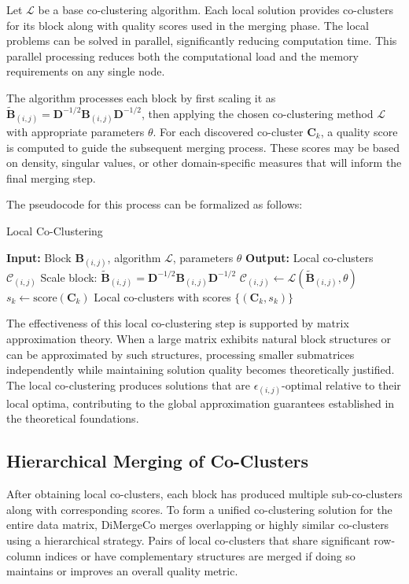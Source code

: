 \documentclass[journal]{IEEEtran}
\begin{document}
Let $\mathcal{L}$ be a base co-clustering algorithm. Each local solution provides co-clusters for its block along with quality scores used in the merging phase. The local problems can be solved in parallel, significantly reducing computation time. This parallel processing reduces both the computational load and the memory requirements on any single node.

The algorithm processes each block by first scaling it as $\tilde{\mathbf{B}}_{(i,j)} = \mathbf{D}^{-1/2}\mathbf{B}_{(i,j)}\mathbf{D}^{-1/2}$, then applying the chosen co-clustering method $\mathcal{L}$ with appropriate parameters $\theta$. For each discovered co-cluster $\mathbf{C}_k$, a quality score is computed to guide the subsequent merging process. These scores may be based on density, singular values, or other domain-specific measures that will inform the final merging step.

The pseudocode for this process can be formalized as follows:

\begin{algorithm}[t]
    \caption{Local Co-Clustering}
    \label{alg:local_co_clustering}
    \begin{algorithmic}
        \STATE \textbf{Input:} Block $\mathbf{B}_{(i,j)}$, algorithm $\mathcal{L}$, parameters $\theta$
        \STATE \textbf{Output:} Local co-clusters $\mathcal{C}_{(i,j)}$
        \STATE Scale block: $\tilde{\mathbf{B}}_{(i,j)} = \mathbf{D}^{-1/2}\mathbf{B}_{(i,j)}\mathbf{D}^{-1/2}$
        \STATE $\mathcal{C}_{(i,j)} \leftarrow \mathcal{L}(\tilde{\mathbf{B}}_{(i,j)}, \theta)$
        \STATE $s_k \leftarrow \text{score}(\mathbf{C}_k)$
        \ENDFOR
        \RETURN Local co-clusters with scores $\{(\mathbf{C}_k, s_k)\}$
    \end{algorithmic}
\end{algorithm}


The effectiveness of this local co-clustering step is supported by matrix approximation theory. When a large matrix exhibits natural block structures or can be approximated by such structures, processing smaller submatrices independently while maintaining solution quality becomes theoretically justified. The local co-clustering produces solutions that are $\epsilon_{(i,j)}$-optimal relative to their local optima, contributing to the global approximation guarantees established in the theoretical foundations.

\subsection{Hierarchical Merging of Co-Clusters}
\label{subsec:hierarchical_merging}
After obtaining local co-clusters, each block has produced multiple sub-co-clusters along with corresponding scores. To form a unified co-clustering solution for the entire data matrix, DiMergeCo merges overlapping or highly similar co-clusters using a hierarchical strategy. Pairs of local co-clusters that share significant row-column indices or have complementary structures are merged if doing so maintains or improves an overall quality metric.
\end{document}
